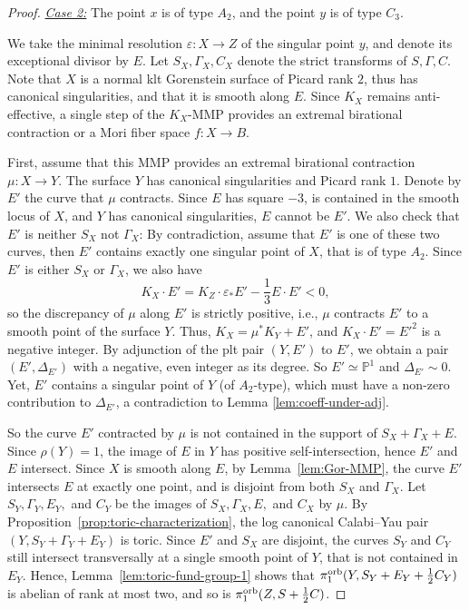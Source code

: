 \documentclass{amsart}
\newcommand{\pp}{\mathbb{P}}
\theoremstyle{definition}
\theoremstyle{remark}
\numberwithin{equation}{section}
\begin{document}
\begin{proof}
\medskip 

\noindent\underline{\textit{Case 2:}} The point $x$ is of type $A_2$, and the point $y$ is of type $C_3$.

\noindent We take the minimal resolution $\varepsilon\colon X\rightarrow Z$ of the singular point $y$, and denote its exceptional divisor by $E$. Let $S_X,\Gamma_X,C_X$ denote the strict transforms of $S,\Gamma,C$. Note that $X$ is a normal klt Gorenstein surface of Picard rank $2$, thus has canonical singularities, and that it is smooth along $E$. Since $K_X$ remains anti-effective, a single step of the $K_X$-MMP provides an extremal birational contraction or a Mori fiber space $f:X\to B$.

First, assume that this MMP provides an extremal birational contraction $\mu: X\to Y$. The surface $Y$ has canonical singularities and Picard rank $1$. Denote by $E'$ the curve that $\mu$ contracts. Since $E$ has square $-3$, is contained in the smooth locus of $X$, and $Y$ has canonical singularities, $E$ cannot be $E'$. We also check that $E'$ is neither $S_X$ not $\Gamma_X$: By contradiction, assume that $E'$ is one of these two curves, then $E'$ contains exactly one singular point of $X$, that is of type $A_2$. %
Since $E'$ is either $S_X$ or $\Gamma_X$, we also have 
$$K_X\cdot E' = K_Z\cdot\varepsilon_* E' - \frac{1}{3}E\cdot E' < 0,$$ 
so the discrepancy of $\mu$ along $E'$ is strictly positive, i.e., $\mu$ contracts $E'$ to a smooth point of the surface $Y$. Thus, $K_X=\mu^*K_Y + E'$, and $K_X\cdot E' = E'^2$ is a negative integer. By adjunction of the plt pair $(Y,E')$ to $E'$, we obtain a pair $(E',\Delta_{E'})$ with a negative, even integer as its degree. So $E'\simeq \pp^1$ and $\Delta_{E'}\sim 0$. Yet, $E'$ contains a singular point of $Y$ (of $A_2$-type), which must have a non-zero contribution to $\Delta_{E'}$, a contradiction to Lemma \ref{lem:coeff-under-adj}.


So the curve $E'$ contracted by $\mu$ is not contained in the support of $S_X+\Gamma_X+E$. Since $\rho(Y)=1$, the image of $E$ in $Y$ has positive self-intersection, hence $E'$ and $E$ intersect. Since $X$ is smooth along $E$, by Lemma~\ref{lem:Gor-MMP}, the curve $E'$ 
intersects $E$ at exactly one point, and is disjoint from both $S_X$ and $\Gamma_X$. Let $S_Y,\Gamma_Y,E_Y,$ and $C_Y$ be the images of $S_X,\Gamma_X,E,$ and $C_X$ by $\mu$.
By Proposition~\ref{prop:toric-characterization}, the log canonical Calabi--Yau pair $(Y,S_Y+\Gamma_Y+E_Y)$ is toric.
Since $E'$ and $S_X$ are disjoint, the curves $S_Y$ and $C_Y$ still intersect transversally at a single smooth point of $Y$, that is not contained in $E_Y$.
Hence, Lemma~\ref{lem:toric-fund-group-1} shows that $\pi_1^{\rm orb}(Y,S_Y+E_Y+\frac{1}{2}C_Y)$ is abelian of rank at most two, and so is $\pi_1^{\rm orb}(Z,S+\frac{1}{2}C)$.


\end{proof}
\end{document}

